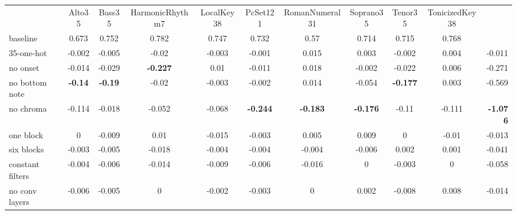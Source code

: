 

\begin{table}[]
    \begin{tabular}{lcccccccccr}
                                    & Alto35         & Bass35         & HarmonicRhythm7 & LocalKey38      & PcSet121        & RomanNumeral31  & Soprano35       & Tenor35         & TonicizedKey38  & \multicolumn{1}{l}{} \\
    baseline                        & 0.673          & 0.752          & 0.782           & 0.747           & 0.732           & 0.57            & 0.714           & 0.715           & 0.768           & \multicolumn{1}{l}{} \\
    35-one-hot                      & -0.002         & -0.005         & -0.02           & -0.003          & -0.001          & 0.015           & 0.003           & -0.002          & 0.004           & -0.011               \\
    no onset                        & -0.014         & -0.029         & \textbf{-0.227} & 0.01            & -0.011          & 0.018           & -0.002          & -0.022          & 0.006           & -0.271               \\
    no bottom note                  & \textbf{-0.14} & \textbf{-0.19} & -0.02           & -0.003          & -0.002          & 0.014           & -0.054          & \textbf{-0.177} & 0.003           & -0.569               \\
    no chroma                       & -0.114         & -0.018         & -0.052          & -0.068          & \textbf{-0.244} & \textbf{-0.183} & \textbf{-0.176} & -0.11           & -0.111          & \textbf{-1.076}      \\
    one block                       & 0              & -0.009         & 0.01            & -0.015          & -0.003          & 0.005           & 0.009           & 0               & -0.01           & -0.013               \\
    six blocks                      & -0.003         & -0.005         & -0.018          & -0.004          & -0.004          & -0.004          & -0.006          & 0.002           & 0.001           & -0.041               \\
    constant filters                & -0.004         & -0.006         & -0.014          & -0.009          & -0.006          & -0.016          & 0               & -0.003          & 0               & -0.058               \\
    no conv layers                  & -0.006         & -0.005         & 0               & -0.002          & -0.003          & 0               & 0.002           & -0.008          & 0.008           & -0.014               \\

\end{tabular}
\end{table}
